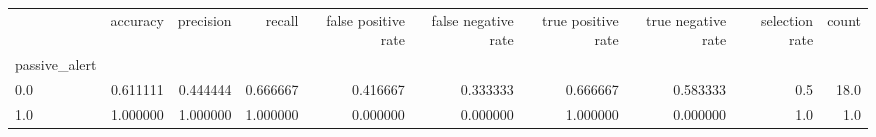 \begin{tabular}{lrrrrrrrrr}
\toprule
{} &  accuracy &  precision &    recall &  false positive rate &  false negative rate &  true positive rate &  true negative rate &  selection rate &  count \\
passive\_alert &           &            &           &                      &                      &                     &                     &                 &        \\
\midrule
0.0           &  0.611111 &   0.444444 &  0.666667 &             0.416667 &             0.333333 &            0.666667 &            0.583333 &             0.5 &   18.0 \\
1.0           &  1.000000 &   1.000000 &  1.000000 &             0.000000 &             0.000000 &            1.000000 &            0.000000 &             1.0 &    1.0 \\
\bottomrule
\end{tabular}
